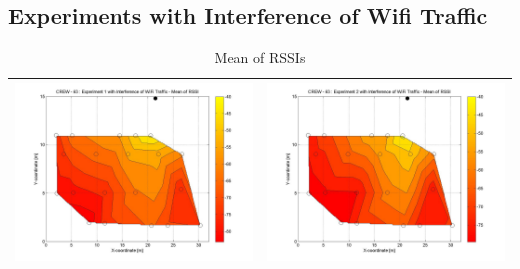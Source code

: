 \documentclass[11pt,a4paper,headinclude,footinclude,chapterprefix=on]{scrreprt}
\begin{document}
\subsection{Experiments with Interference of Wifi Traffic}
\begin{table}
	[h] \centering \caption{Mean of RSSIs} 
	\label{tb:63:Wifi:mean} 
	\begin{tabular}
		{|l|l|} \hline 
		\includegraphics[width=8cm]{../../Source/plot/CREW_63/63_Wifi_Ex_1_Mean.jpg} & 		\includegraphics[width=8cm]{../../Source/plot/CREW_63/63_Wifi_Ex_2_Mean.jpg} \\
		\hline
	\end{tabular}
\end{table}
\end{document}
